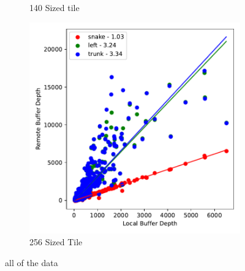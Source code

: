 \begin{figure}
\begin{subfigure}[b]{0.475\textwidth}
      \caption[]%
      {\small 140 Sized tile}    
  \end{subfigure}
  \hfill
  \begin{subfigure}[b]{0.475\textwidth}   
      \centering 
      \includegraphics[width=\textwidth]{./images/mp60_256_slow_route_fits.pdf}
      \caption[]%
      {\small 256 Sized Tile}    
  \end{subfigure}
  \caption[ Information on the 4 by 4 tile. ]
  {\small all of the data } 
  \label{fig:compare_slow_plots_for_digital_sim_slow}
\end{figure}


